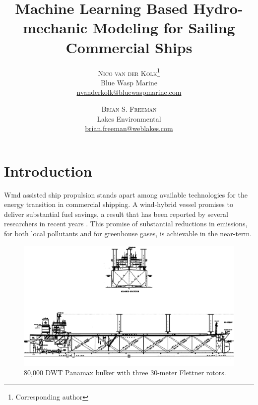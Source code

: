 \documentclass[twoside,twocolumn]{article}
\title{Machine Learning Based Hydro-mechanic Modeling for Sailing Commercial Ships} %
\author{%
\textsc{Nico van der Kolk}\thanks{Corresponding author} \\[1ex] %
\normalsize Blue Wasp Marine \\ %
\normalsize \href{mailto:nvanderkolk@bluewaspmarine.com}{nvanderkolk@bluewaspmarine.com} %
\and %
\textsc{Brian S. Freeman} \\[1ex] %
\normalsize Lakes Environmental \\ %
\normalsize \href{brian.freeman@weblakes.com}{brian.freeman@weblakes.com } %
}
\date{} %
\begin{document}






\maketitle


\printnomenclature

\section{Introduction}

\lettrine[nindent=0em,lines=3]{W}ind assisted ship propulsion stands apart among available technologies for the energy transition in commercial shipping. A wind-hybrid vessel promises to deliver substantial fuel savings, a result that has been reported by several researchers in recent years \cite{Fujiwara05a, Naaijen10, Traut14, Eggers16}. This promise of substantial reductions in emissions, for both local pollutants and for greenhouse gases, is achievable in the near-term.

\begin{figure}[!ht]
	\centering
	\includegraphics[width=\textwidth]{images/Panamax530.png}  %
	\caption{80,000 DWT Panamax bulker with three 30-meter Flettner rotors.}
	\label{fig:Panamax}
\end{figure}
\end{document}

